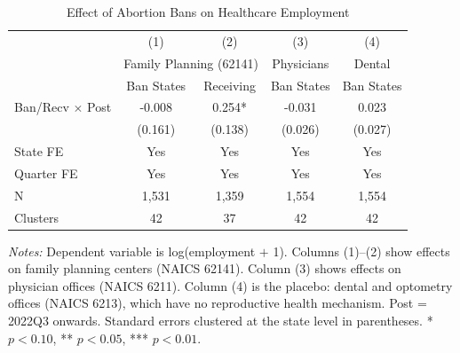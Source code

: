 \begin{table}[H]
\centering
\caption{Effect of Abortion Bans on Healthcare Employment}
\label{tab:main}
\begin{threeparttable}
\begin{tabular}{lcccc}
\toprule
 & (1) & (2) & (3) & (4) \\
 & \multicolumn{2}{c}{Family Planning (62141)} & Physicians & Dental \\
 & Ban States & Receiving & Ban States & Ban States \\
\midrule
Ban/Recv $\times$ Post & -0.008 & 0.254* & -0.031 & 0.023 \\
 & (0.161) & (0.138) & (0.026) & (0.027) \\
\midrule
State FE & Yes & Yes & Yes & Yes \\
Quarter FE & Yes & Yes & Yes & Yes \\
N & 1,531 & 1,359 & 1,554 & 1,554 \\
Clusters & 42 & 37 & 42 & 42 \\
\bottomrule
\end{tabular}
\begin{tablenotes}[flushleft]
\small
\item \textit{Notes:} Dependent variable is log(employment $+$ 1). Columns (1)--(2) show effects on family planning centers (NAICS 62141). Column (3) shows effects on physician offices (NAICS 6211). Column (4) is the placebo: dental and optometry offices (NAICS 6213), which have no reproductive health mechanism. Post = 2022Q3 onwards. Standard errors clustered at the state level in parentheses. * $p<0.10$, ** $p<0.05$, *** $p<0.01$.
\end{tablenotes}
\end{threeparttable}
\end{table}

